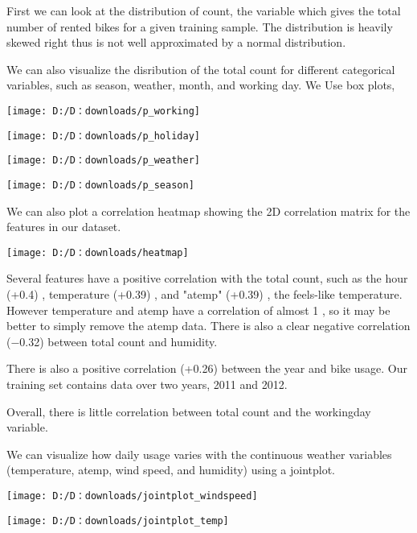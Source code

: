First we can look at the distribution of count, 
the variable which gives the total number of rented bikes for a given training sample. 
The distribution is heavily skewed right  thus is not well approximated by a normal distribution.

We can also visualize the disribution of the total count for different categorical variables, 
such as season, weather, month, and working day. 
We Use box plots, 

\begin{center}
\texttt{[image: D:/D：downloads/p\_working]}
\end{center}
\begin{center}
\texttt{[image: D:/D：downloads/p\_holiday]}
\end{center}
\begin{center}
\texttt{[image: D:/D：downloads/p\_weather]}
\end{center}
\begin{center}
\texttt{[image: D:/D：downloads/p\_season]}
\end{center}
We can also plot a correlation heatmap showing the 2D correlation matrix for the features in our dataset. 

\begin{center}
\centering
\texttt{[image: D:/D：downloads/heatmap]}
\centering
\end{center}

Several features have a positive correlation with the total count, such as the hour  (+0.4) , temperature  (+0.39) , and "atemp"  (+0.39) , the feels-like temperature. However temperature and atemp have a correlation of almost  1 , so it may be better to simply remove the atemp data. There is also a clear negative correlation  (−0.32)  between total count and humidity.

There is also a positive correlation  (+0.26)  between the year and bike usage. Our training set contains data over two years, 2011 and 2012.

Overall, there is little correlation between total count and the workingday variable. 

We can visualize how daily usage varies with the continuous weather variables (temperature, atemp, wind speed, and humidity) using a jointplot. 
\begin{center}
	\texttt{[image: D:/D：downloads/jointplot\_windspeed]}
\end{center}

\begin{center}
	\texttt{[image: D:/D：downloads/jointplot\_temp]}
\end{center}

